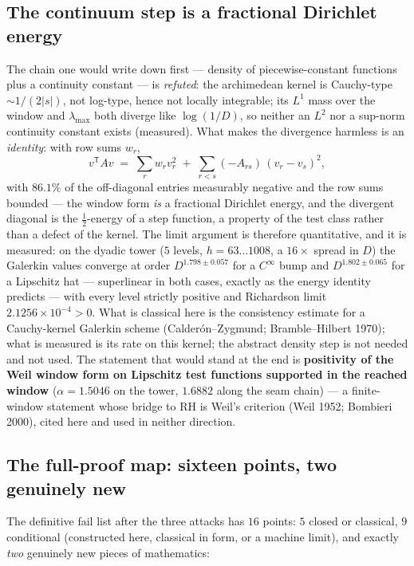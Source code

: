 \documentclass[11pt,a4paper]{article}
\begin{document}
\subsection{The continuum step is a fractional Dirichlet energy}
The chain one would write down first --- density of piecewise-constant functions plus a continuity
constant --- is \emph{refuted}: the archimedean kernel is Cauchy-type ${\sim}1/(2|s|)$, not
log-type, hence not locally integrable; its $L^1$ mass over the window and $\lambda_{\max}$ both
diverge like $\log(1/D)$, so neither an $L^2$ nor a sup-norm continuity constant exists (measured).
What makes the divergence harmless is an \emph{identity}: with row sums $w_r$,
\[
v^{\mathsf T}Av \;=\; \sum_r w_r v_r^2 \;+\; \sum_{r<s}(-A_{rs})\,(v_r-v_s)^2 ,
\]
with $86.1\%$ of the off-diagonal entries measurably negative and the row sums bounded --- the
window form \emph{is} a fractional Dirichlet energy, and the divergent diagonal is the
$\tfrac12$-energy of a step function, a property of the test class rather than a defect of the
kernel. The limit argument is therefore quantitative, and it is measured: on the dyadic tower
($5$ levels, $h=63\ldots1008$, a $16\times$ spread in $D$) the Galerkin values converge at order
$D^{1.798\pm0.057}$ for a $C^\infty$ bump and $D^{1.802\pm0.065}$ for a Lipschitz hat ---
superlinear in both cases, exactly as the energy identity predicts --- with every level strictly
positive and Richardson limit $2.1256\times10^{-4}>0$. What is classical here is the consistency
estimate for a Cauchy-kernel Galerkin scheme (Calder\'on--Zygmund; Bramble--Hilbert 1970); what is
measured is its rate on this kernel; the abstract density step is not needed and not used. The
statement that would stand at the end is \textbf{positivity of the Weil window form on Lipschitz
test functions supported in the reached window} ($\alpha=1.5046$ on the tower, $1.6882$ along the
seam chain) --- a finite-window statement whose bridge to RH is Weil's criterion (Weil 1952;
Bombieri 2000), cited here and used in neither direction.

\subsection{The full-proof map: sixteen points, two genuinely new}\label{sec:phase2map}
The definitive fail list after the three attacks has $16$ points: $5$ closed or classical, $9$
conditional (constructed here, classical in form, or a machine limit), and exactly \emph{two}
genuinely new pieces of mathematics:
\end{document}
